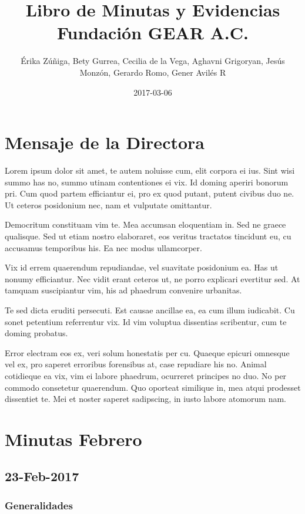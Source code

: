 \documentclass[]{book}
\title{Libro de Minutas y Evidencias Fundación GEAR A.C.}
\author{Érika Zúñiga, Bety Gurrea, Cecilia de la Vega, Aghavni Grigoryan, Jesús
Monzón, Gerardo Romo, Gener Avilés R}
\date{2017-03-06}
\begin{document}
\maketitle

{
\setcounter{tocdepth}{1}
\tableofcontents
}
\chapter{Mensaje de la Directora}\label{mensaje-de-la-directora}

Lorem ipsum dolor sit amet, te autem noluisse cum, elit corpora ei ius.
Sint wisi summo has no, summo utinam contentiones ei vix. Id doming
aperiri bonorum pri. Cum quod partem efficiantur ei, pro ex quod putant,
putent civibus duo ne. Ut ceteros posidonium nec, nam et vulputate
omittantur.

Democritum constituam vim te. Mea accumsan eloquentiam in. Sed ne graece
qualisque. Sed ut etiam nostro elaboraret, eos veritus tractatos
tincidunt eu, cu accusamus temporibus his. Ea nec modus ullamcorper.

Vix id errem quaerendum repudiandae, vel suavitate posidonium ea. Has ut
nonumy efficiantur. Nec vidit erant ceteros ut, ne porro explicari
evertitur sed. At tamquam suscipiantur vim, his ad phaedrum convenire
urbanitas.

Te sed dicta eruditi persecuti. Est causae ancillae ea, ea cum illum
iudicabit. Cu sonet petentium referrentur vix. Id vim voluptua
dissentias scribentur, cum te doming probatus.

Error electram eos ex, veri solum honestatis per cu. Quaeque epicuri
omnesque vel ex, pro saperet erroribus forensibus at, case repudiare his
no. Animal cotidieque ea vix, vim ei labore phaedrum, ocurreret
principes no duo. No per commodo consetetur quaerendum. Quo oporteat
similique in, mea atqui prodesset dissentiet te. Mei et noster saperet
sadipscing, in iusto labore atomorum nam.

\chapter{Minutas Febrero}\label{intro}

\section{23-Feb-2017}\label{feb-2017}

\subsection{Generalidades}\label{generalidades}
\end{document}
